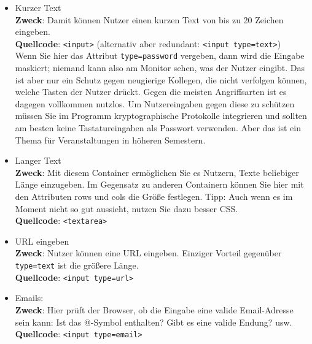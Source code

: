 \begin{itemize}
	\item Kurzer Text\\
	
	\textbf{Zweck}: Damit können Nutzer einen kurzen Text von bis zu 20 Zeichen eingeben.\\
	
	\textbf{Quellcode}: \verb|<input>| (alternativ aber redundant: \verb|<input type=text>|)\\
	
	Wenn Sie hier das Attribut \verb|type=password| vergeben, dann wird die Eingabe maskiert; niemand kann also am Monitor sehen, was der Nutzer eingibt. Das ist aber nur ein Schutz gegen neugierige Kollegen, die nicht verfolgen können, welche Tasten der Nutzer drückt. Gegen die meisten Angriffsarten ist es dagegen vollkommen nutzlos. Um Nutzereingaben gegen diese zu schützen müssen Sie im Programm kryptographische Protokolle integrieren und sollten am besten keine Tastatureingaben als Passwort verwenden. Aber das ist ein Thema für Veranstaltungen in höheren Semestern.\\

	\item Langer Text\\

	\textbf{Zweck}: Mit diesem Container ermöglichen Sie es Nutzern, Texte beliebiger Länge einzugeben. Im Gegensatz zu anderen Containern können Sie hier mit den Attributen rows und cols die Größe festlegen. Tipp: Auch wenn es im Moment nicht so gut aussieht, nutzen Sie dazu besser CSS.\\

	\textbf{Quellcode}: \verb|<textarea>|\\

	\item URL eingeben\\

	\textbf{Zweck}: Nutzer können eine URL eingeben. Einziger Vorteil gegenüber \verb|type=text| ist die größere Länge.\\
	
	\textbf{Quellcode}: \verb|<input type=url>|\\

	\item Emails:\\

	\textbf{Zweck}: Hier prüft der Browser, ob die Eingabe eine valide Email-Adresse sein kann: Ist das @-Symbol enthalten? Gibt es eine valide Endung? usw.\\
	
	\textbf{Quellcode}: \verb|<input type=email>|\\
\end{itemize}

